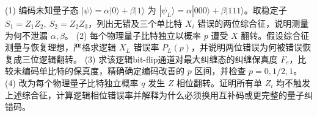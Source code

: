 (1) 编码未知量子态 \(|\psi\rangle=\alpha|0\rangle+\beta|1\rangle\) 为 \(|\psi_L\rangle=\alpha|000\rangle+\beta|111\rangle\)。取稳定子 \(S_1=Z_1Z_2,\ S_2=Z_2Z_3\)，列出无错及三个单比特 \(X_i\) 错误的两位综合征，说明测量为何不泄漏 \(\alpha,\beta\)。
(2) 每个物理量子比特独立以概率 \(p\) 遭受 \(X\) 翻转。假设综合征测量与恢复理想，严格求逻辑 \(X_L\) 错误率 \(P_L(p)\)，并说明两位错误为何被错误恢复成三位逻辑翻转。
(3) 求该逻辑bit-flip通道对最大纠缠态的纠缠保真度 \(F_e\)，比较未编码单比特的保真度，精确确定编码改善的 \(p\) 区间，并检查 \(p=0,1/2,1\)。
(4) 改为每个物理量子比特独立概率 \(q\) 发生 \(Z\) 相位翻转。证明所有单 \(Z_i\) 均不触发上述综合征，计算逻辑相位错误率并解释为什么必须换用互补码或更完整的量子纠错码。

